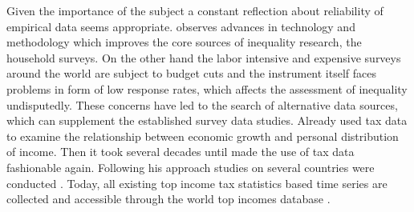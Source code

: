 \documentclass[twoside]{article}\usepackage[]{graphicx}\usepackage[]{color}
\begin{document}
\begin{multicols}{2}
Given the importance of the subject a constant reflection about reliability of empirical data seems appropriate. \citet{gornick_foreword_2013} observes advances in technology and methodology which improves the core sources of inequality research, the household surveys.  On the other hand the labor intensive and expensive surveys around the world are subject to budget cuts and the instrument itself faces problems in form of low response rates, which affects the assessment of inequality undisputedly. These concerns have led to the search of alternative data sources, which can supplement the established survey data studies. Already \citet{kuznets_economic_1955} used tax data to examine the relationship between economic growth and personal distribution of income. Then it took several decades until \citet{piketty_les_2001, piketty_income_2003,piketty_income_2003-1} made the use of tax data fashionable again. Following his approach studies on several countries were conducted \citep{atkinson_top_2007,atkinson_top_2010}. Today, all existing top income tax statistics based time series are collected and accessible through the world top incomes database \citep{alvaredo_world_2014}. \\


\end{multicols}
\end{document}
